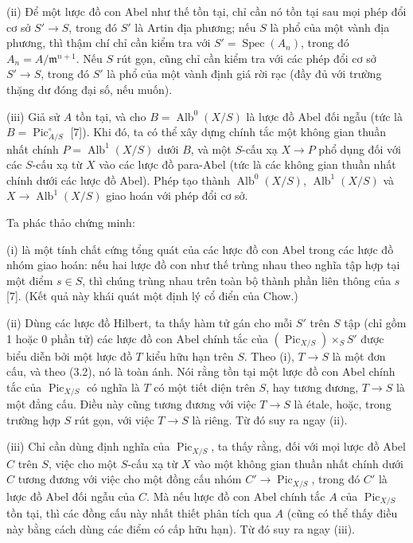 \noindent(ii) Để một lược đồ con Abel như thế tồn tại, chỉ cần nó tồn tại sau
mọi phép đổi cơ sở $S'\longrightarrow S$, trong đó $S'$ là Artin địa phương;
nếu $S$ là phổ của một vành địa phương, thì thậm chí chỉ cần kiểm tra với
$S'=\operatorname{Spec}(A_n)$, trong đó
$A_n=A/\mathfrak m^{n+1}$. Nếu $S$ rút gọn, cũng chỉ cần kiểm tra với các phép
đổi cơ sở $S'\longrightarrow S$, trong đó $S'$ là phổ của một vành định giá
rời rạc (đầy đủ với trường thặng dư đóng đại số, nếu muốn).

\noindent(iii) Giả sử $A$ tồn tại, và cho
$B=\operatorname{Alb}^0(X/S)$ là lược đồ Abel đối ngẫu (tức là
$B=\operatorname{Pic}_{A/S}^\circ$ [7]). Khi đó, ta có thể xây dựng chính tắc
một không gian thuần nhất chính $P=\operatorname{Alb}^1(X/S)$ dưới $B$, và
một $S$-cấu xạ $X\longrightarrow P$ phổ dụng đối với các $S$-cấu xạ từ $X$
vào các lược đồ para-Abel (tức là các không gian thuần nhất chính dưới các
lược đồ Abel). Phép tạo thành $\operatorname{Alb}^0(X/S)$,
$\operatorname{Alb}^1(X/S)$ và
$X\longrightarrow\operatorname{Alb}^1(X/S)$ giao hoán với phép đổi cơ sở.

Ta phác thảo chứng minh:

(i) là một tính chất cứng tổng quát của các lược đồ con Abel trong các lược đồ
nhóm giao hoán: nếu hai lược đồ con như thế trùng nhau theo nghĩa tập hợp tại
một điểm $s\in S$, thì chúng trùng nhau trên toàn bộ thành phần
liên thông của $s$ [7]. (Kết quả này khái quát một định lý cổ điển của Chow.)

(ii) Dùng các lược đồ Hilbert, ta thấy hàm tử gán cho mỗi $S'$ trên $S$ tập
(chỉ gồm 1 hoặc 0 phần tử) các lược đồ con Abel chính tắc của
$(\operatorname{Pic}_{X/S})\times_S S'$ được biểu diễn bởi một lược đồ $T$
kiểu hữu hạn trên $S$. Theo (i), $T\longrightarrow S$ là một đơn cấu, và theo
(3.2), nó là toàn ánh. Nói rằng tồn tại một lược đồ con Abel chính tắc của
$\operatorname{Pic}_{X/S}$ có nghĩa là $T$ có một tiết diện trên $S$, hay
tương đương, $T\longrightarrow S$ là một đẳng cấu. Điều này cũng tương đương
với việc $T\longrightarrow S$ là étale, hoặc, trong trường hợp $S$ rút gọn,
với việc $T\longrightarrow S$ là riêng. Từ đó suy ra ngay (ii).

(iii) Chỉ cần dùng định nghĩa của $\operatorname{Pic}_{X/S}$, ta thấy rằng,
đối với mọi lược đồ Abel $C$ trên $S$, việc cho một $S$-cấu xạ từ $X$ vào một
không gian thuần nhất chính dưới $C$ tương đương với việc cho một đồng cấu nhóm
$C'\longrightarrow\operatorname{Pic}_{X/S}$, trong đó $C'$ là lược đồ Abel
đối ngẫu của $C$. Mà nếu lược đồ con Abel chính tắc $A$ của
$\operatorname{Pic}_{X/S}$ tồn tại, thì các đồng cấu này nhất thiết phân tích
qua $A$ (cũng có thể thấy điều này bằng cách dùng các điểm có cấp hữu hạn). Từ
đó suy ra ngay (iii).

